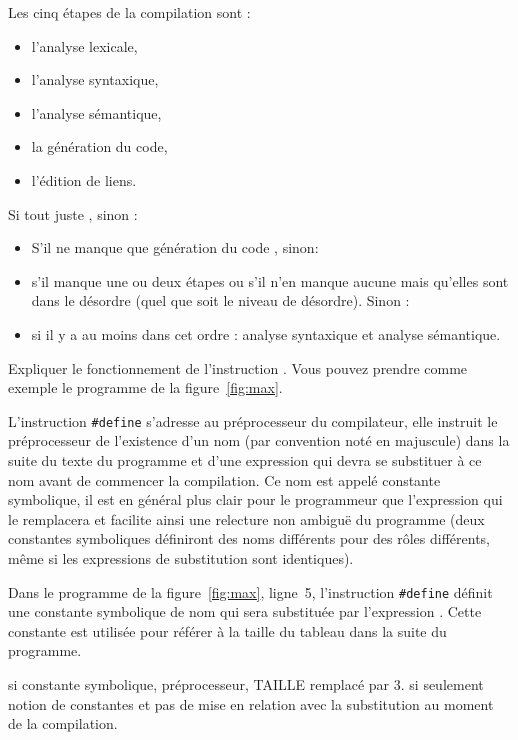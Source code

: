 \begin{correction}
Les cinq étapes de la compilation sont :
  \begin{itemize}
  \item l'analyse lexicale,
\item l'analyse syntaxique,
\item l'analyse sémantique,
\item la génération du code,
\item l'édition de liens.
  \end{itemize}
  \begin{baremeenv}
Si tout juste , sinon :
    \begin{itemize}
\item S'il ne manque que génération du code , sinon:
    \item {} s'il manque une ou deux étapes ou s'il n'en manque
      aucune mais qu'elles sont dans le désordre (quel que soit le
      niveau de désordre). Sinon :
    \item {} si il y a au moins dans cet ordre : analyse syntaxique
      et analyse sémantique.
    \end{itemize}
  \end{baremeenv}
\end{correction}
\question Expliquer le fonctionnement de l'instruction
. Vous pouvez prendre comme exemple le programme de la
figure~\ref{fig:max}. 

\begin{correction}
  L'instruction \verb|#define| s'adresse au préprocesseur du
  compilateur, elle instruit le préprocesseur de l'existence d'un nom
  (par convention noté en majuscule) dans la suite du texte du
  programme et d'une expression qui devra se substituer à ce nom avant
  de commencer la compilation. Ce nom est appelé constante symbolique,
  il est en général plus clair pour le programmeur que l'expression
  qui le remplacera et facilite ainsi une relecture non ambiguë du
  programme (deux constantes symboliques définiront des noms
  différents pour des rôles différents, même si les expressions de
  substitution sont
  identiques).

Dans le programme de la
figure~\ref{fig:max}, ligne~5, l'instruction \verb|#define| définit une
constante symbolique de nom  qui sera substituée par
l'expression . Cette constante est utilisée pour référer à la
taille du tableau  dans la suite du programme.

 \begin{baremeenv}
 si constante symbolique, préprocesseur,  TAILLE remplacé
      par 3.  si seulement notion de constantes et pas de mise en
      relation avec la substitution au moment de la compilation.
\end{baremeenv}
\end{correction}

